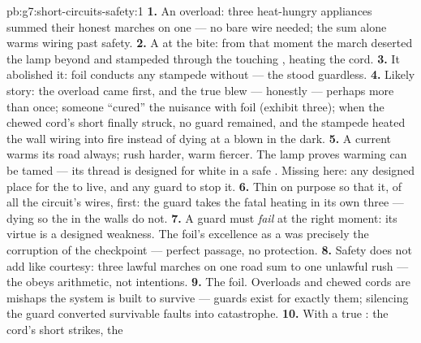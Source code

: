 \begin{solution}{pb:g7:short-circuits-safety:1}
\textbf{1.} An overload: three heat-hungry appliances summed
their honest marches on one  --- no bare wire needed; the
sum alone warms wiring past safety.
\textbf{2.} A  at the bite: from that moment the
march deserted the lamp beyond and stampeded through the touching
, heating the cord.
\textbf{3.} It abolished it: foil conducts any stampede without
 --- the  stood guardless.
\textbf{4.} Likely story: the overload came first, and the true
 blew --- honestly --- perhaps more than once; someone
``cured'' the nuisance with foil (exhibit three); when the
chewed cord's short finally struck, no guard remained, and the
stampede heated the wall wiring into fire instead of dying at a
blown  in the dark.
\textbf{5.} A current warms its road always; rush harder, warm
fiercer. The lamp proves warming can be tamed --- its thread is
designed for white  in a safe . Missing here: any
designed place for the  to live, and any guard to stop it.
\textbf{6.} Thin on purpose so that it, of all the circuit's
wires,  first: the guard takes the fatal heating in its own
three  --- dying so the  in the walls do not.
\textbf{7.} A guard must \emph{fail} at the right moment: its
virtue is a designed weakness. The foil's excellence as a
 was precisely the corruption of the checkpoint ---
perfect passage, no protection.
\textbf{8.} Safety does not add like courtesy: three lawful
marches on one road sum to one unlawful rush --- the 
obeys arithmetic, not intentions.
\textbf{9.} The foil. Overloads and chewed cords are mishaps the
system is built to survive --- guards exist for exactly them;
silencing the guard converted survivable faults into
catastrophe.
\textbf{10.} With a true : the cord's short strikes, the

\end{solution}
